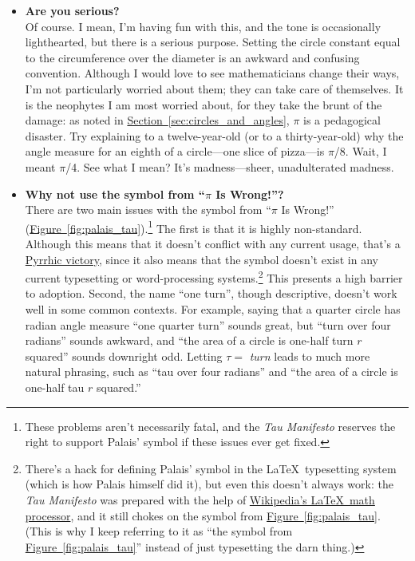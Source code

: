 \documentclass{article}
\begin{document}
\begin{itemize}

  \item \textbf{Are you serious?} \\ Of course. I mean, I'm having fun with this, and the tone is occasionally lighthearted, but there is a serious purpose. Setting the circle constant equal to the circumference over the diameter is an awkward and confusing convention. Although I would love to see mathematicians change their ways, I'm not particularly worried about them; they can take care of themselves. It is the neophytes I am most worried about, for they take the brunt of the damage: as noted in \hyperref[sec:circles_and_angles]{Section~}\ref{sec:circles_and_angles}, $\pi$ is a pedagogical disaster. Try explaining to a twelve-year-old (or to a thirty-year-old) why the angle measure for an eighth of a circle---one slice of pizza---is $\pi$/8. Wait, I meant $\pi$/4. See what I mean? It's madness---sheer, unadulterated madness.

  \item \textbf{Why not use the symbol from ``$\pi$ Is Wrong!''?} \\ There are two main issues with the symbol from ``$\pi$ Is Wrong!'' (\hyperref[fig:palais_tau]{Figure~}\ref{fig:palais_tau}).\footnote{These problems aren't necessarily fatal, and the \emph{Tau Manifesto} reserves the right to support Palais' symbol if these issues ever get fixed.} The first is that it is highly non-standard. Although this means that it doesn't conflict with any current usage, that's a \href{http://en.wikipedia.org/wiki/Pyrrhic_victory}{Pyrrhic victory}, since it also means that the symbol doesn't exist in any current typesetting or word-processing systems.\footnote{There's a hack for defining Palais' symbol in the \LaTeX\ typesetting system (which is how Palais himself did it), but even this doesn't always work: the \emph{Tau Manifesto} was prepared with the help of \href{http://en.wikipedia.org/wiki/Texvc}{Wikipedia's \LaTeX\ math processor}, and it still chokes on the symbol from \hyperref[fig:palais_tau]{Figure~}\ref{fig:palais_tau}. (This is why I keep referring to it as ``the symbol from \hyperref[fig:palais_tau]{Figure~}\ref{fig:palais_tau}'' instead of just typesetting the darn thing.)} This presents a high barrier to adoption. Second, the name ``one turn'', though descriptive, doesn't work well in some common contexts. For example, saying that a quarter circle has radian angle measure ``one quarter turn'' sounds great, but ``turn over four radians'' sounds awkward, and ``the area of a circle is one-half turn $r$ squared'' sounds downright odd. Letting $\tau = $ \emph{turn} leads to much more natural phrasing, such as ``tau over four radians'' and ``the area of a circle is one-half tau $r$ squared.''


\end{itemize}
\end{document}
